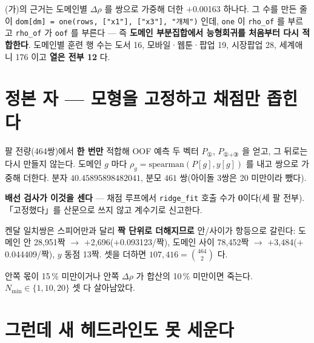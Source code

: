 \documentclass[10pt]{article}
\begin{document}
(가)의 근거는 도메인별 $\Delta\rho$ 를 쌍으로 가중해 더한 $+$0.00163 하나다. 그 수를
만든 줄이 \verb|dom[dm] = one(rows, ["x1"], ["x3"], "개체")| 인데, \verb|one| 이
\verb|rho_of| 를 부르고 \verb|rho_of| 가 \verb|oof| 를 부른다 --- 즉 \textbf{도메인
부분집합에서 능형회귀를 처음부터 다시 적합한다}. 도메인별 훈련 행 수는 도서 16,
모바일·웹툰·팝업 19, 시장팝업 28, 세계애니 176 이고 \textbf{열은 전부 12} 다.


\section{정본 자 --- 모형을 고정하고 채점만 좁힌다}

팔 전량(464쌍)에서 \textbf{한 번만} 적합해 OOF 예측 두 벡터 $P_\text{①}$,
$P_\text{①+③}$ 을 얻고, 그 뒤로는 다시 만들지 않는다. 도메인 $g$ 마다
$\rho_g=\mathrm{spearman}(P[g],y[g])$ 를 내고 쌍으로 가중해 더한다. 분자
$40.45895898482041$, 분모 $461$ 쌍(아이돌 3쌍은 20 미만이라 뺐다).

\textbf{배선 검사가 이것을 센다} --- 채점 루프에서 \verb|ridge_fit| 호출 수가
\textbf{0}이다(세 팔 전부). 「고정했다」를 산문으로 쓰지 않고 계수기로 신고한다.

켄달 일치쌍은 스피어만과 달리 \textbf{짝 단위로 더해지므로} 안/사이가 항등으로 갈린다:
도메인 안 28{,}951짝 $\to$ $+$2{,}696($+$0.093123/짝), 도메인 사이 78{,}452짝 $\to$
$+$3{,}484($+$0.044409/짝), $y$ 동점 13짝. 셋을 더하면 $107{,}416=\binom{464}{2}$ 다.

{안쪽 몫이 15\,\% 미만이거나 안쪽 $\Delta\rho$ 가 합산의 10\,\% 미만이면 죽는다.
$N_{\min}\in\{1,10,20\}$ 셋 다 살아남았다.}

\section{그런데 새 헤드라인도 못 세운다}
\end{document}

